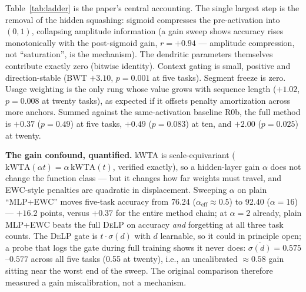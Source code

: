 \documentclass[conference]{IEEEtran}
\newcommand{\delp}{\textsc{DeLP}}
\begin{document}
Table~\ref{tab:ladder} is the paper's central accounting. The single largest step is the removal
of the hidden squashing: sigmoid compresses the pre-activation into $(0,1)$, collapsing amplitude
information (a gain sweep shows accuracy rises monotonically with the post-sigmoid gain,
$r=+0.94$ --- amplitude compression, not ``saturation'', is the mechanism). The dendritic
parameters themselves contribute exactly zero (bitwise identity). Context gating is small, positive
and direction-stable (BWT $+3.10$, $p=0.001$ at five tasks). Segment freeze is zero. Usage
weighting is the only rung whose value grows with sequence length ($+1.02$, $p=0.008$ at twenty
tasks), as expected if it offsets penalty amortization across more anchors. Summed against the
same-activation baseline R0b, the full method is $+0.37$ ($p=0.49$) at five tasks, $+0.49$
($p=0.083$) at ten, and $+2.00$ ($p=0.025$) at twenty.

\noindent\textbf{The gain confound, quantified.} kWTA is scale-equivariant
($\mathrm{kWTA}(\alpha t)=\alpha\,\mathrm{kWTA}(t)$, verified exactly), so a hidden-layer gain
$\alpha$ does not change the function class --- but it changes how far weights must travel, and
EWC-style penalties are quadratic in displacement. Sweeping $\alpha$ on plain ``MLP+EWC'' moves
five-task accuracy from 76.24 ($\alpha_{\mathrm{eff}}\approx0.5$) to 92.40 ($\alpha{=}16$) ---
$+16.2$ points, versus $+0.37$ for the entire method chain; at $\alpha{=}2$ already, plain
MLP+EWC beats the full \delp{} on accuracy \emph{and} forgetting at all three task counts. The
\delp{} gate is $t\cdot\sigma(d)$ with $d$ learnable, so it could in principle open; a probe that
logs the gate during full training shows it never does: $\overline{\sigma(d)}=0.575$--$0.577$
across all five tasks (0.55 at twenty), i.e., an uncalibrated $\approx0.58$ gain sitting near the
worst end of the sweep. The original comparison therefore measured a gain miscalibration, not a
mechanism.
\end{document}
